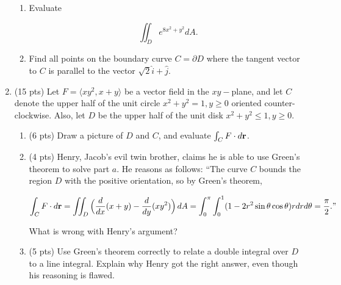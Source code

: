 \documentclass[12 pt]{report}
\begin{document}
\begin{enumerate}
\begin{enumerate} \item Evaluate

$$\iint_D e^{8x^2+y^2} dA.$$

\vfill 

\item Find all points on the boundary curve $C = \partial D$ where the tangent vector to $C$ is parallel to the vector $\sqrt{2} \hat{i} + \hat{j}$.

\vfill

\end{enumerate}


\newpage

\item (15 pts) Let $F = \langle xy^2, x+y \rangle$ be a vector field in the $xy-$plane, and let $C$ denote the upper half of the unit circle $x^2+y^2 = 1, y \geq 0$ oriented counter-clockwise. Also, let $D$ be the upper half of the unit disk $x^2 + y^2 \leq 1, y \geq 0$. 
\begin{enumerate}
\item (6 pts) Draw a picture of $D$ and $C$, and evaluate $\int_C F \cdot d\bold{r}$. 

\vspace{7cm}

\item (4 pts) Henry, Jacob's evil twin brother, claims he is able to use Green's theorem to solve part $a$. He reasons as follows: ``The curve $C$ bounds the region $D$ with the positive orientation, so by Green's theorem, 

$$\int_C F \cdot d\bold{r} = \iint_D \Big(\frac{d}{dx}(x+y) - \frac{d}{dy}(xy^2) \Big) \, dA = \int_0^\pi \int_0^1 (1-2r^2 \sin\theta \cos\theta) r dr d\theta = \frac{\pi}{2}."$$

What is wrong with Henry's argument?   

\vspace{3cm} 

\item (5 pts) Use Green's theorem correctly to relate a double integral over $D$ to a line integral. Explain why Henry got the right answer, even though his reasoning is flawed. 



\end{enumerate} 


\end{enumerate}
\end{document}
